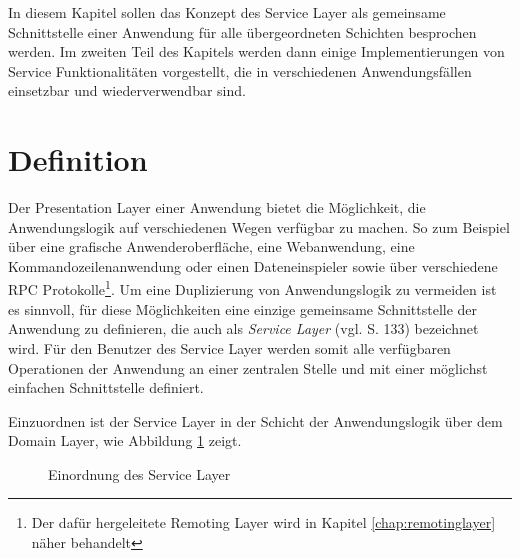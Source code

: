 \label{chap:servicelayer}
In diesem Kapitel sollen das Konzept  des Service Layer als gemeinsame
Schnittstelle einer Anwendung für alle übergeordneten Schichten besprochen
werden. Im zweiten Teil des Kapitels werden dann einige Implementierungen von
Service Funktionalitäten vorgestellt, die in verschiedenen Anwendungsfällen
einsetzbar und wiederverwendbar sind.

\section{Definition}
Der Presentation Layer einer Anwendung bietet die Möglichkeit, die
Anwendungslogik auf verschiedenen Wegen verfügbar zu machen. So zum Beispiel
über eine grafische Anwenderoberfläche, eine Webanwendung, eine
Kommandozeilenanwendung oder einen Dateneinspieler sowie über verschiedene
\ac{RPC} Protokolle\footnote{Der dafür hergeleitete Remoting Layer wird in
Kapitel \ref{chap:remotinglayer} näher behandelt}. Um eine Duplizierung von
Anwendungslogik zu vermeiden ist es sinnvoll, für diese Möglichkeiten eine
einzige gemeinsame Schnittstelle der Anwendung zu definieren, die auch als
\emph{Service Layer} (vgl. \cite{fowler:2002} S. 133) bezeichnet wird. Für den
Benutzer des Service Layer werden somit alle verfügbaren Operationen der Anwendung an
einer zentralen Stelle und mit einer möglichst einfachen Schnittstelle definiert.

Einzuordnen ist der Service Layer in der Schicht der Anwendungslogik
über dem Domain Layer, wie Abbildung \ref{ill:servicelayer} zeigt.

\begin{figure}[bth]
	\caption{Einordnung des Service Layer}
	\label{ill:servicelayer}
\end{figure}


